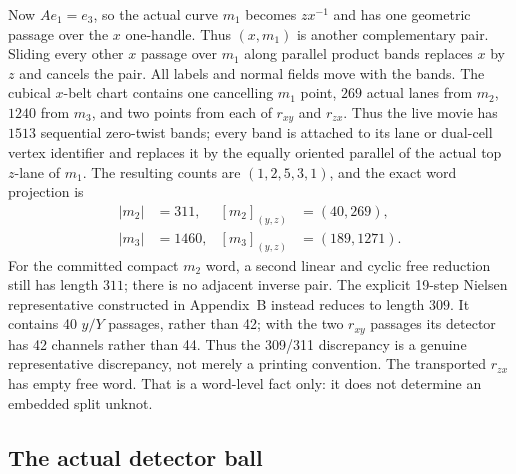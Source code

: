 Now $Ae_1=e_3$, so the actual curve $m_1$ becomes $zx^{-1}$ and has one
geometric passage over the $x$ one-handle.  Thus $(x,m_1)$ is another
complementary pair.  Sliding every other $x$ passage over $m_1$ along parallel
product bands replaces $x$ by $z$ and cancels the pair.  All labels and
normal fields move with the bands.
The cubical $x$-belt chart contains one cancelling $m_1$ point, $269$ actual
lanes from $m_2$, $1240$ from $m_3$, and two points from each of $r_{xy}$ and
$r_{zx}$.  Thus the live movie has $1513$ sequential zero-twist bands; every
band is attached to its lane or dual-cell vertex identifier and replaces it
by the equally oriented parallel of the actual top $z$-lane of $m_1$.
The resulting counts are $(1,2,5,3,1)$,
and the exact word projection is
\[
\begin{aligned}
|m_2|&=311, & [m_2]_{(y,z)}&=(40,269),\\
|m_3|&=1460, & [m_3]_{(y,z)}&=(189,1271).
\end{aligned}
\]
For the committed compact $m_2$ word, a second linear and cyclic free
reduction still has length $311$; there is no adjacent inverse pair.  The
explicit 19-step Nielsen representative constructed in Appendix~B instead
reduces to length $309$.  It contains 40 $y/Y$ passages, rather than 42; with
the two $r_{xy}$ passages its detector has 42 channels rather than 44.  Thus
the 309/311 discrepancy is a genuine representative discrepancy, not merely
a printing convention.
The transported $r_{zx}$ has empty free word.  That is a word-level fact
only: it does not determine an embedded split unknot.

\subsection{The actual detector ball}

